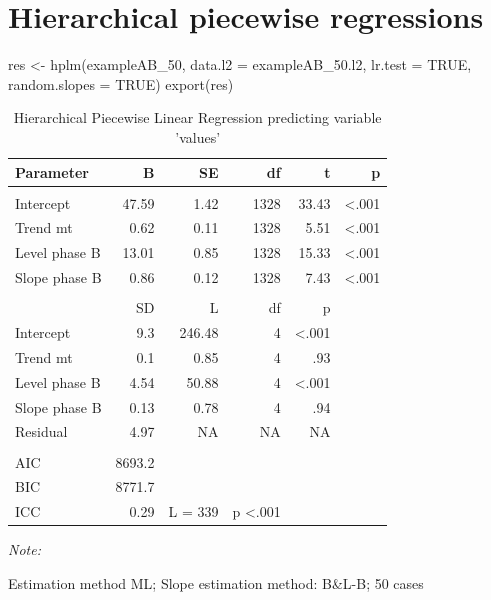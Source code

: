 \documentclass[
]{book}
\newenvironment{Shaded}{\begin{snugshade}}{\end{snugshade}}
\newcommand{\AttributeTok}[1]{\textcolor[rgb]{0.77,0.63,0.00}{#1}}
\newcommand{\ConstantTok}[1]{\textcolor[rgb]{0.00,0.00,0.00}{#1}}
\newcommand{\FunctionTok}[1]{\textcolor[rgb]{0.00,0.00,0.00}{#1}}
\newcommand{\NormalTok}[1]{#1}
\newcommand{\OtherTok}[1]{\textcolor[rgb]{0.56,0.35,0.01}{#1}}
\begin{document}
\hypertarget{hierarchical-piecewise-regressions}{%
\section{Hierarchical piecewise regressions}\label{hierarchical-piecewise-regressions}}

\begin{Shaded}
\begin{Highlighting}[]
\NormalTok{res }\OtherTok{\textless{}{-}} \FunctionTok{hplm}\NormalTok{(exampleAB\_50, }\AttributeTok{data.l2 =}\NormalTok{ exampleAB\_50.l2, }\AttributeTok{lr.test =} \ConstantTok{TRUE}\NormalTok{, }\AttributeTok{random.slopes =} \ConstantTok{TRUE}\NormalTok{)}
\FunctionTok{export}\NormalTok{(res)}
\end{Highlighting}
\end{Shaded}

\begin{table}[!h]

\caption{\label{tab:unnamed-chunk-78}Hierarchical Piecewise Linear Regression predicting variable 'values'}
\begin{threeparttable}
\begin{tabular}[t]{lrrrrr}
\toprule
Parameter & B & SE & df & t & p\\
\midrule
\addlinespace[0.3em]
\multicolumn{6}{l}{\textbf{Fixed effects}}\\
Intercept & 47.59 & 1.42 & 1328 & 33.43 & <.001\\
Trend mt & 0.62 & 0.11 & 1328 & 5.51 & <.001\\
Level phase B & 13.01 & 0.85 & 1328 & 15.33 & <.001\\
Slope phase B & 0.86 & 0.12 & 1328 & 7.43 & <.001\\
\midrule
\addlinespace[0.3em]
\multicolumn{6}{l}{\textbf{Random effects}}\\
 & SD & L & df & p & \\
Intercept & 9.3 & 246.48 & 4 & <.001 & \\
Trend mt & 0.1 & 0.85 & 4 & .93 & \\
Level phase B & 4.54 & 50.88 & 4 & <.001 & \\
Slope phase B & 0.13 & 0.78 & 4 & .94 & \\
Residual & 4.97 & NA & NA & NA & \\
\midrule
\addlinespace[0.3em]
\multicolumn{6}{l}{\textbf{Model}}\\
AIC & 8693.2 &  &  &  & \\
BIC & 8771.7 &  &  &  & \\
ICC & 0.29 & L = 339 & p <.001 &  & \\
\bottomrule
\end{tabular}
\begin{tablenotes}
\item \textit{Note: } 
\item Estimation method ML; Slope estimation method: B\&L-B; 50 cases
\end{tablenotes}
\end{threeparttable}
\end{table}
\end{document}
